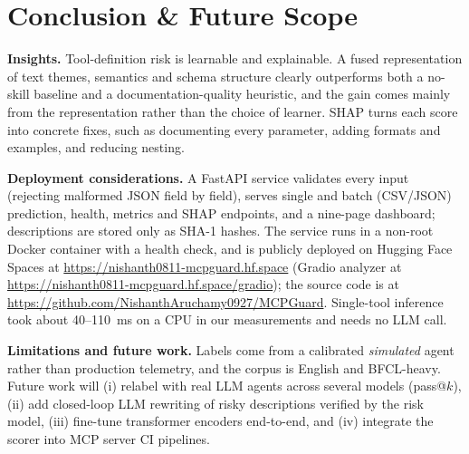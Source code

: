 \documentclass[conference]{IEEEtran}
\begin{document}
\section{Conclusion \& Future Scope}
\textbf{Insights.} Tool-definition risk is learnable and explainable. A fused representation of text themes, semantics and schema structure clearly outperforms both a no-skill baseline and a documentation-quality heuristic, and the gain comes mainly from the representation rather than the choice of learner. SHAP turns each score into concrete fixes, such as documenting every parameter, adding formats and examples, and reducing nesting.

\textbf{Deployment considerations.} A FastAPI service validates every input (rejecting malformed JSON field by field), serves single and batch (CSV/JSON) prediction, health, metrics and SHAP endpoints, and a nine-page dashboard; descriptions are stored only as SHA-1 hashes. The service runs in a non-root Docker container with a health check, and is publicly deployed on Hugging Face Spaces at \url{https://nishanth0811-mcpguard.hf.space} (Gradio analyzer at \url{https://nishanth0811-mcpguard.hf.space/gradio}); the source code is at \url{https://github.com/NishanthAruchamy0927/MCPGuard}. Single-tool inference took about 40--110~ms on a CPU in our measurements and needs no LLM call.

\textbf{Limitations and future work.} Labels come from a calibrated \emph{simulated} agent rather than production telemetry, and the corpus is English and BFCL-heavy. Future work will (i) relabel with real LLM agents across several models (pass@$k$), (ii) add closed-loop LLM rewriting of risky descriptions verified by the risk model, (iii) fine-tune transformer encoders end-to-end, and (iv) integrate the scorer into MCP server CI pipelines.
\end{document}

